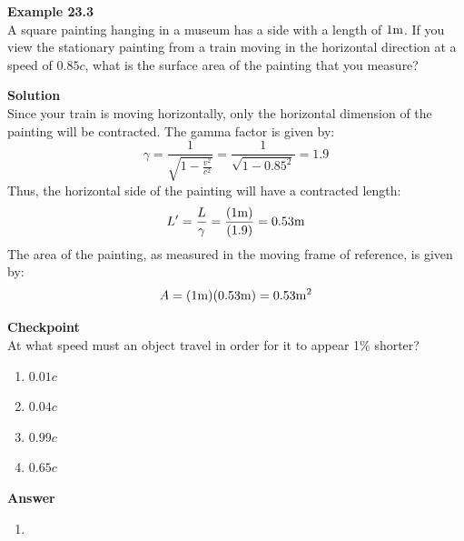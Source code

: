 \begin{framed}
\textbf{Example 23.3}\\
A square painting hanging in a museum has a side with a length of $1 {\rm m}$. If you view the stationary painting from a train moving in the horizontal direction at a speed of $0.85c$, what is the surface area of the painting that you measure?

\begin{framed}
\textbf{Solution}\\
Since your train is moving horizontally, only the horizontal dimension of the painting will be contracted. The gamma factor is given by:
\begin{equation}
\gamma = \frac{1}{\sqrt{1-\frac{v^2}{c^2}}} =\frac{1}{\sqrt{1-0.85^2}}=1.9
\end{equation}
Thus, the horizontal side of the painting will have a contracted length:
\begin{equation}
L'=\frac{L}{\gamma}=\frac{(1 {\rm m})}{(1.9)}=0.53 {\rm m}
\end{equation}
The area of the painting, as measured in the moving frame of reference, is given by:
\begin{equation}
A= (1 {\rm m})(0.53 {\rm m})=0.53 {\rm m^2}
\end{equation}
\end{framed}
\end{framed}

\begin{framed}
\textbf{Checkpoint}\\
At what speed must an object travel in order for it to appear 1\% shorter?

\begin{enumerate}
\item $0.01c$
\item $0.04c$
\item $0.99c$
\item $0.65c$
\end{enumerate}

\begin{framed}
\textbf{Answer}\\
\begin{enumerate}[resume]
\item
\end{enumerate}
\end{framed}
\end{framed}


